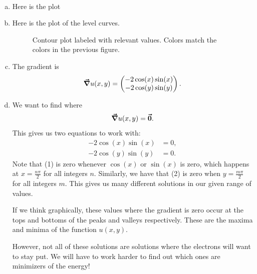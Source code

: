 \documentclass[12pt]{article} %
\begin{document}
\begin{solution}~
\begin{enumerate}[(a)]
    \item Here is the plot
    \begin{figure}[H]
        \centering
	\def\svgwidth{0.75\columnwidth}
	
    \end{figure}
    \item Here is the plot of the level curves.
    \begin{figure}[H]
        \centering
	\def\svgwidth{0.75\columnwidth}
	
        \caption{Contour plot labeled with relevant values. Colors match the colors in the previous figure.}
    \end{figure}

    \item The gradient is
    \[
    \boldsymbol{\vec{\nabla}} u(x,y) = \begin{pmatrix} -2\cos(x)\sin(x) \\ -2\cos(y)\sin(y) \end{pmatrix}.
    \]
    \item We want to find where
    \[
    \boldsymbol{\vec{\nabla}} u(x,y) = \boldsymbol{\vec{0}}.
    \]
    This gives us two equations to work with:
    \begin{align}
        -2\cos(x)\sin(x) &= 0,\\
        -2\cos(y)\sin(y) &= 0.
    \end{align}
    Note that (1) is zero whenever $\cos(x)$ or $\sin(x)$ is zero, which happens at $x=\frac{n\pi}{2}$ for all integers $n$. Similarly, we have that (2) is zero when $y=\frac{m\pi}{2}$ for all integers $m$.  This gives us many different solutions in our given range of values.

    If we think graphically, these values where the gradient is zero occur at the tops and bottoms of the peaks and valleys respectively.  These are the maxima and minima of the function $u(x,y)$.

    However, not all of these solutions are solutions where the electrons will want to stay put.  We will have to work harder to find out which ones are minimizers of the energy!
\end{enumerate}
\end{solution}
\end{document}
